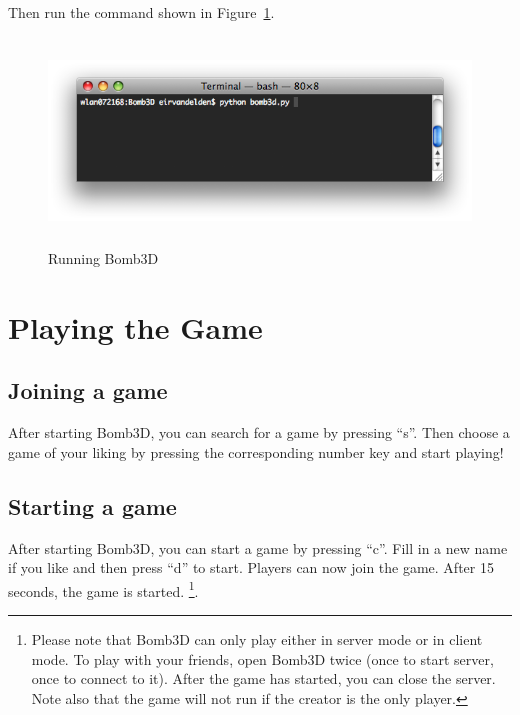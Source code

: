 \documentclass[a4paper,twoside,11pt]{book}
\theoremstyle{plain} \newtheorem{powerup}{Power-Up}
\begin{document}
        Then run the command shown in Figure~\ref{fig:run_game}.
        
        \begin{figure}[!ht]
          \centering
          \includegraphics[width=14cm,height=5.5cm]{diagrams/run_game}
          \caption{Running Bomb3D} \label{fig:run_game}
        \end{figure}
        


\chapter{Playing the Game} %
\label{cha:playing_the_game}
    
    \section{Joining a game}

    After starting Bomb3D, you can search for a game by pressing ``s''. Then choose a game of your liking by pressing the corresponding number key and start playing!
    
    
    \section{Starting a game} %
    \label{sec:starting_a_game}
        After starting Bomb3D, you can start a game by pressing ``c''. Fill in a new name if you like and then press ``d'' to start. Players can now join the game. After 15 seconds, the game is started. \footnote{Please note that Bomb3D can only play either in server mode or in client mode. To play with your friends, open Bomb3D twice (once to start server, once to connect to it). After the game has started, you can close the server. Note also that the game will not run if the creator is the only player.}.
        
\end{document}
